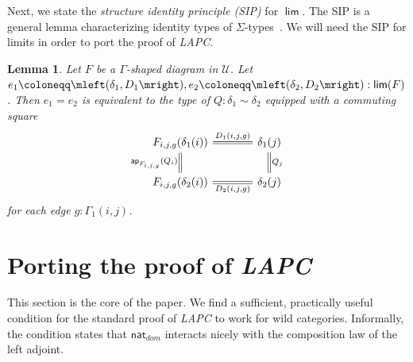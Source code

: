 \documentclass[10pt,a4paper]{article}
\newtheorem{lem}[thm]{Lemma}
\theoremstyle{definition}
\theoremstyle{remark}
\newcommand{\U}{\mathcal{U}}
\newcommand{\dom}{\textit{dom}}
\newcommand{\nat}{\mathsf{nat}}
\newcommand{\0}{\mathbf{0}}
\newcommand{\1}{\mathbf{1}}
\newcommand{\2}{\mathbf{2}}
\DeclareMathOperator{\ap}{\mathsf{ap}}
\DeclareMathOperator{\limm}{\mathsf{lim}}
\begin{document}
Next, we state the \emph{structure identity principle (SIP)} for $\limm$. The SIP is a general lemma characterizing identity types of $\Sigma$-types~\cite[Theorem 11.6.2]{FTID}. We will need the SIP for limits in order to port the proof of \emph{LAPC}.

\begin{lem}\label{SIPlim}
Let $F$ be a $\Gamma$-shaped diagram in $\U$. Let $e_1 \coloneqq \mleft(\delta_1, D_1\mright), e_2 \coloneqq \mleft(\delta_2, D_2\mright) : \limm(F)$. Then $e_1 = e_2$ is equivalent to the type of $Q : \delta_1 \sim \delta_2$ equipped with a commuting square 
\[\begin{tikzcd}[column sep = large]
	{F_{i,j,g}(\delta_1(i))} & {\delta_1(j)} \\
	{F_{i,j,g}(\delta_2(i))} & {\delta_2(j)}
	\arrow["{D_1(i,j,g)}", equals, from=1-1, to=1-2]
	\arrow["{\ap_{F_{i,j,g}}(Q_i)}"', equals, from=1-1, to=2-1]
	\arrow["{Q_j}", equals, from=1-2, to=2-2]
	\arrow["{D_2(i,j,g)}"', equals, from=2-1, to=2-2]
\end{tikzcd}\]
for each edge $g : \Gamma_1(i,j)$.
\end{lem}

\section{Porting the proof of \emph{LAPC}} \label{2Adj}

This section is the core of the paper. We find a sufficient, practically useful condition for the standard proof of \emph{LAPC} to work for wild categories. Informally, the condition states that $\nat_{\dom}$ interacts nicely with the composition law of the left adjoint.
\end{document}
